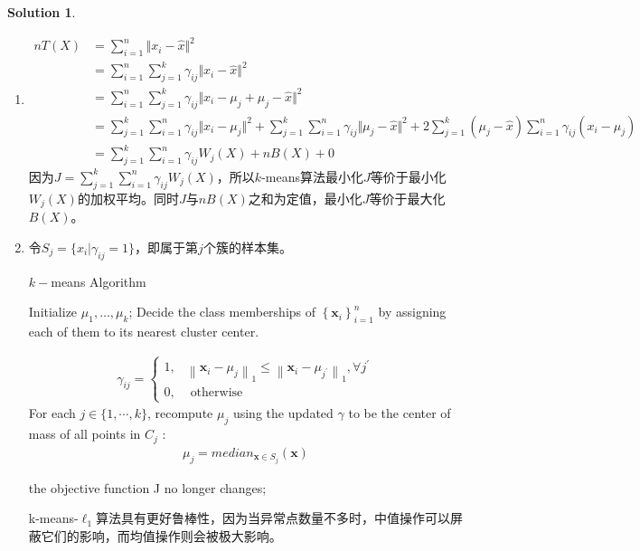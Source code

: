 \documentclass[a4paper,UTF8]{article}
\theoremstyle{definition}
\newtheorem*{solution}{Solution}
\begin{document}
\begin{solution}
\begin{enumerate}[(1)]
		\item 
		\begin{align*}
		nT(X)&=\sum_{i=1}^n\Vert x_i-\hat{x} \Vert^2\\
		&=\sum_{i=1}^n\sum_{j=1}^k\gamma_{ij}\Vert x_i-\hat{x} \Vert^2\\
		&=\sum_{i=1}^n\sum_{j=1}^k\gamma_{ij}\Vert x_i-\mu_j+\mu_j-\hat{x} \Vert^2\\
		&=\sum_{j=1}^k\sum_{i=1}^n\gamma_{ij}\Vert x_i-\mu_j \Vert^2+\sum_{j=1}^k\sum_{i=1}^n\gamma_{ij}\Vert\mu_j-\hat{x} \Vert^2+2\sum_{j=1}^k(\mu_j-\hat{x})\sum_{i=1} ^n\gamma_{ij}(x_i-\mu_j)\\
		&=\sum_{j=1}^k\sum_{i=1}^n\gamma_{ij}W_j(X)+nB(X)+0
		\end{align*}
		因为$J=\sum_{j=1}^k\sum_{i=1}^n\gamma_{ij}W_j(X)$，所以$k$-means算法最小化$J$等价于最小化$W_j(X)$的加权平均。同时$J$与$nB(X)$之和为定值，最小化$J$等价于最大化$B(X)$。
		
		\item 
		令$S_j=\{x_i|\gamma_{ij}=1\}$，即属于第$j$个簇的样本集。
		{\begin{algorithm}[H]
				\caption{ $k-$means Algorithm }
				\label{alg:alg2}
				\begin{algorithmic}[1]{
						\STATE Initialize $\mu_{1}, \ldots, \mu_{k}$;
						\REPEAT
						 Decide the class memberships of $\left\{\mathbf{x}_{i}\right\}_{i=1}^{n}$ by assigning each of them
						to its nearest cluster center.
						
						\begin{align}\gamma_{i j}=\left\{\begin{array}{ll}
						1, & \left\|\mathbf{x}_{i}-\mu_{j}\right\|_1 \leq\left\|\mathbf{x}_{i}-\mu_{j^{\prime}}\right\|_1, \forall j^{\prime} \\
						0, & \text { otherwise }
						\end{array}\right.\end{align}
						 For each $j \in\{1, \cdots, k\}$, recompute $\mu_j$ using the updated 
						$\gamma$ to be	the center of mass of all points in $C_j$ :
						\begin{align}\mu_{j}=median_{\mathbf{x}\in S_j}(\mathbf{x})\end{align}	
						
						\UNTIL the objective function J no longer changes;}
				\end{algorithmic}
		\end{algorithm}}
		k-means-$\ell_{1}$算法具有更好鲁棒性，因为当异常点数量不多时，中值操作可以屏蔽它们的影响，而均值操作则会被极大影响。
	\end{enumerate}
\end{solution}
\end{document}
